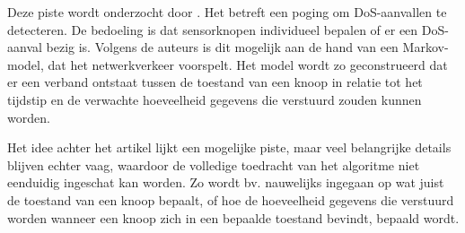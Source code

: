Deze piste wordt onderzocht door \citep{zhijie2012intrusion}. Het betreft een
poging om DoS-aanvallen te detecteren. De bedoeling is dat sensorknopen
individueel bepalen of er een DoS-aanval bezig is. Volgens de auteurs is dit
mogelijk aan de hand van een Markov-model, dat het netwerkverkeer voorspelt.
Het model wordt zo geconstrueerd dat er een verband ontstaat tussen de toestand
van een knoop in relatie tot het tijdstip en de verwachte hoeveelheid gegevens
die verstuurd zouden kunnen worden.

Het idee achter het artikel lijkt een mogelijke piste, maar veel belangrijke
details blijven echter vaag, waardoor de volledige toedracht van het algoritme
niet eenduidig ingeschat kan worden. Zo wordt bv. nauwelijks ingegaan op wat
juist de toestand van een knoop bepaalt, of hoe de hoeveelheid gegevens die
verstuurd worden wanneer een knoop zich in een bepaalde toestand bevindt,
bepaald wordt.
